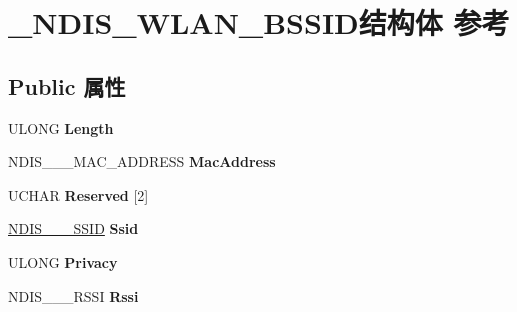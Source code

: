 \hypertarget{struct___n_d_i_s___w_l_a_n___b_s_s_i_d}{}\section{\+\_\+\+N\+D\+I\+S\+\_\+\+W\+L\+A\+N\+\_\+\+B\+S\+S\+I\+D结构体 参考}
\label{struct___n_d_i_s___w_l_a_n___b_s_s_i_d}
\subsection*{Public 属性}
\begin{DoxyCompactItemize}
\item 
\mbox{\label{struct___n_d_i_s___w_l_a_n___b_s_s_i_d_a6ad1e13d355065de7b009b2674c21752}} 
U\+L\+O\+NG {\bfseries Length}
\item 
\mbox{\label{struct___n_d_i_s___w_l_a_n___b_s_s_i_d_a7c2b2862187705bfcdcce6866960319a}} 
N\+D\+I\+S\+\_\+\_\+\_\+\+M\+A\+C\+\_\+\+A\+D\+D\+R\+E\+SS {\bfseries Mac\+Address}
\item 
\mbox{\label{struct___n_d_i_s___w_l_a_n___b_s_s_i_d_a6272d58ea7e5602331151250850ef723}} 
U\+C\+H\+AR {\bfseries Reserved} \mbox{[}2\mbox{]}
\item 
\mbox{\label{struct___n_d_i_s___w_l_a_n___b_s_s_i_d_af67c37d54921c21d46bf362bd5a3d5a6}} 
\hyperlink{struct___n_d_i_s__802__11___s_s_i_d}{N\+D\+I\+S\+\_\+\_\+\_\+\+S\+S\+ID} {\bfseries Ssid}
\item 
\mbox{\label{struct___n_d_i_s___w_l_a_n___b_s_s_i_d_a5a9937de828f9f3f2516c4bb2fb34695}} 
U\+L\+O\+NG {\bfseries Privacy}
\item 
\mbox{\label{struct___n_d_i_s___w_l_a_n___b_s_s_i_d_a2b2a126bd41cbd256d75c9aa6bb9f83e}} 
N\+D\+I\+S\+\_\+\_\+\_\+\+R\+S\+SI {\bfseries Rssi}
\item 
\mbox{\label{struct___n_d_i_s___w_l_a_n___b_s_s_i_d_adbd9149a001e67680cebdf98b4d046a3}} 

\end{DoxyCompactItemize}
